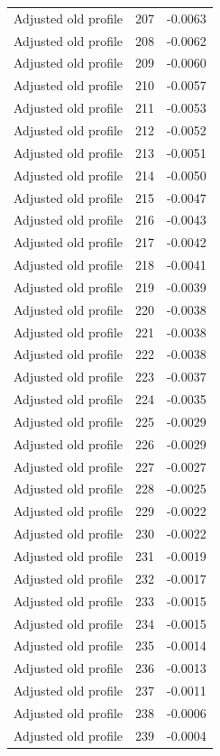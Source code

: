 \begin{table}[htbp]
\begin{tabular}{lll}
Adjusted old profile & 207 & -0.0063 \\
Adjusted old profile & 208 & -0.0062 \\
Adjusted old profile & 209 & -0.0060 \\
Adjusted old profile & 210 & -0.0057 \\
Adjusted old profile & 211 & -0.0053 \\
Adjusted old profile & 212 & -0.0052 \\
Adjusted old profile & 213 & -0.0051 \\
Adjusted old profile & 214 & -0.0050 \\
Adjusted old profile & 215 & -0.0047 \\
Adjusted old profile & 216 & -0.0043 \\
Adjusted old profile & 217 & -0.0042 \\
Adjusted old profile & 218 & -0.0041 \\
Adjusted old profile & 219 & -0.0039 \\
Adjusted old profile & 220 & -0.0038 \\
Adjusted old profile & 221 & -0.0038 \\
Adjusted old profile & 222 & -0.0038 \\
Adjusted old profile & 223 & -0.0037 \\
Adjusted old profile & 224 & -0.0035 \\
Adjusted old profile & 225 & -0.0029 \\
Adjusted old profile & 226 & -0.0029 \\
Adjusted old profile & 227 & -0.0027 \\
Adjusted old profile & 228 & -0.0025 \\
Adjusted old profile & 229 & -0.0022 \\
Adjusted old profile & 230 & -0.0022 \\
Adjusted old profile & 231 & -0.0019 \\
Adjusted old profile & 232 & -0.0017 \\
Adjusted old profile & 233 & -0.0015 \\
Adjusted old profile & 234 & -0.0015 \\
Adjusted old profile & 235 & -0.0014 \\
Adjusted old profile & 236 & -0.0013 \\
Adjusted old profile & 237 & -0.0011 \\
Adjusted old profile & 238 & -0.0006 \\
Adjusted old profile & 239 & -0.0004 \\

\end{tabular}
\end{table}
